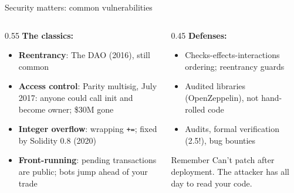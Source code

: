 \ifdefined\PRESENTATION\else\PassOptionsToClass{handout}{beamer}\fi\documentclass[aspectratio=169, lualatex]{beamer}
\begin{document}
\begin{frame}{Security matters: common vulnerabilities}
	\begin{columns}[c]
		\begin{column}{0.55\textwidth}
			\textbf{The classics:}
			\begin{itemize}
				\item \textbf{Reentrancy}: The DAO (2016), still common
				\item \textbf{Access control}: Parity multisig, July 2017: anyone could call init and become owner; \$30M gone
				\item \textbf{Integer overflow}: wrapping \texttt{+=}; fixed by Solidity 0.8 (2020)
				\item \textbf{Front-running}: pending transactions are public; bots jump ahead of your trade
			\end{itemize}
		\end{column}
		\begin{column}{0.45\textwidth}
			\textbf{Defenses:}
			\begin{itemize}
				\item Checks-effects-interactions ordering; reentrancy guards
				\item Audited libraries (OpenZeppelin), not hand-rolled code
				\item Audits, formal verification (2.5!), bug bounties
			\end{itemize}
			\begin{exampleblock}{Remember}
				Can't patch after deployment. The attacker has all day to read your code.
			\end{exampleblock}
		\end{column}
	\end{columns}
\end{frame}
\end{document}
